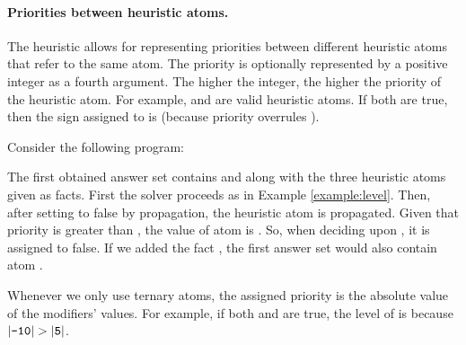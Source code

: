 \paragraph{Priorities between heuristic atoms.}

The  heuristic allows for representing priorities between different heuristic atoms that refer to the same atom.
The priority is optionally represented by a positive integer as a fourth argument.
The higher the integer, the higher the priority of the heuristic atom.
For example,  and  are valid heuristic atoms.
If both are true, then the sign assigned to  is  (because priority  overrules ).  

\begin{example}
\label{example:priority}
Consider the following program:

The first obtained answer set contains  and  along with the three heuristic atoms given as facts.
First the solver proceeds as in Example \ref{example:level}. 
Then, after setting  to false by propagation, 
the heuristic atom  is propagated.
Given that priority  is greater than ,
the  value of atom  is .
So, when deciding upon , it is assigned to false.
If we added the fact , 
the first answer set would also contain atom .
\eexample
\end{example}

\begin{note}
Whenever we only use ternary  atoms, 
the assigned priority is the absolute value of the modifiers' values.
For example, 
if both  and  are true,
the level of  is  because $|\code{-10}|>|\code{5}|$.
\end{note}

